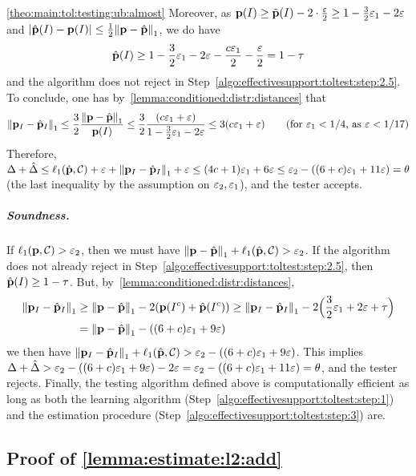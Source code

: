 \begin{proofof}{\cref{theo:main:tol:testing:ub:almost}}
  Moreover, as $\D(I) \geq \tilde{\D}(I) - 2\cdot\frac{\eps}{2} \geq 1-\frac{3}{2}\eps_1-2\eps$ and $\abs{\hat{\D}(I) - \D(I)} \leq \frac{1}{2}\normone{\D-\hat{\D}}$, we do have
  \[
    \hat{\D}(I) \geq 1-\frac{3}{2}\eps_1-2\eps - \frac{c\eps_1}{2}-\frac{\eps}{2} = 1-\tau
  \]
  and the algorithm does not reject in Step~\ref{algo:effectivesupport:toltest:step:2.5}. 
  To conclude, one has by~\cref{lemma:conditioned:distr:distances} that
  \[
      \normone{\D_I-\hat{\D}_I} \leq \frac{3}{2}\frac{\normone{\D-\hat{\D}}}{\D(I)} \leq \frac{3}{2}\frac{(c\eps_1+\eps)}{1-\frac{3}{2}\eps_1-2\eps} \leq 3(c\eps_1+\eps) \tag{for $\eps_1 < 1/4$, as $\eps < 1/17$}
  \]
  Therefore, $\Delta+\hat{\Delta} \leq \lp[1](\hat{\D},\class)+\eps + \normone{\D_I-\hat{\D}_I}+\eps \leq (4c+1)\eps_1+6\eps \leq \eps_2 - ((6+c)\eps_1+11\eps) = \theta$ (the last inequality by the assumption on $\eps_2,\eps_1$), and the tester accepts.
\subparagraph{Soundness.} If $\lp[1](\D,\class) > \eps_2$, then we must have $\normone{\D-\hat{\D}} + \lp[1](\hat{\D},\class) > \eps_2$. If the algorithm does not already reject in Step~\ref{algo:effectivesupport:toltest:step:2.5}, then $\hat{\D}(I) \geq 1-\tau$. But, by~\cref{lemma:conditioned:distr:distances},
  \begin{align*}
      \normone{\D_I-\hat{\D}_I} &\geq \normone{ \D - \hat{\D} } - 2(\D(I^c) + \hat{\D}(I^c)) \geq \normone{\D_I-\hat{\D}_I} - 2\Big(\frac{3}{2}\eps_1 + 2\eps+\tau\Big) \\
      &= \normone{ \D - \hat{\D} } - ((6+c)\eps_1+9\eps) 
  \end{align*}
  we then have $\normone{\D_I-\hat{\D}_I} + \lp[1](\hat{\D},\class) > \eps_2  - ((6+c)\eps_1+9\eps)$. 
  This implies $\Delta+\hat{\Delta} > \eps_2 - ((6+c)\eps_1+9\eps) -2\eps = \eps_2 - ((6+c)\eps_1+11\eps)  = \theta$, and the tester rejects.
Finally, the testing algorithm defined above is computationally efficient as long as both the learning algorithm (Step~\ref{algo:effectivesupport:toltest:step:1}) and the estimation procedure (Step~\ref{algo:effectivesupport:toltest:step:3}) are.

\end{proofof}
 
  
\subsection{Proof of \cref{lemma:estimate:l2:add}}\label{app:l2:proof}


